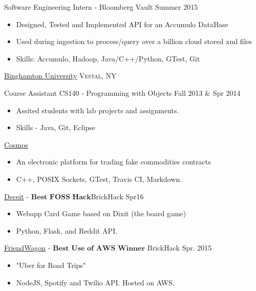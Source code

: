 \documentclass[11pt]{article}
\begin{document}
\headedsection  %
{}
{} 
{
    \headedsubsection
    {Software Engineering Intern - Bloomberg Vault}
    {Summer 2015}
    {
        \begin{itemize}
            \item Designed, Tested and Implemented API for an Accumulo DataBase
            \item Used during ingestion to process/query over a billion cloud stored xml files
            \item Skills: Accumulo, Hadoop, Java/C++/Python, GTest, Git
        \end{itemize}
    }
}
\headedsection
{\href{}{Binghamton University}}
{\textsc{Vestal, NY}} {
    \headedsubsection
    {Course Assistant CS140 - Programming with Objects}
    {Fall 2013 \& Spr 2014}
    {
        \begin{itemize}
            \item Assited students with lab projects and assignments.
            \item Skills - Java, Git, Eclipse
        \end{itemize}
    }
}


\spacedhrule{0.1em}{0.5em}  %

\projects
{{\href{https://github.com/gabeochoa/Cosmos}{Cosmos}}}{}
{
    \begin{itemize}[label={}]
        \setlength\itemsep{.005ex}
        \item{An electronic platform for trading fake commodities contracts}
        \item{C++, POSIX Sockets, GTest, Travis CI, Markdown.}
    \end{itemize}
}

\projects
{{\href{https://github.com/gabeochoa/sokim}{Deceit}} - $\textbf{Best FOSS Hack}$}{BrickHack Spr16}
{
    \begin{itemize}[label={}]
        \setlength\itemsep{.005ex}
        \item{Webapp Card Game based on Dixit (the board game)}
        \item{Python, Flask, and Reddit API.}
    \end{itemize}
}

\headedsubsection
{{\href{https://github.com/alanplotko/RoadTrip}{FriendWagon}} - $\textbf{Best Use of AWS Winner}$ }
{BrickHack Spr. 2015}
{
    \begin{itemize}[label={}]
    	\setlength\itemsep{.005ex}
        \item{"Uber for Road Trips"}
        \item{NodeJS, Spotify and Twilio API. Hosted on AWS.}
    \end{itemize}
}
\end{document}
